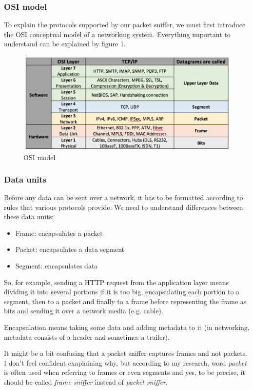 \documentclass[a4paper]{article}
\begin{document}
  \subsubsection{OSI model}
  
  To explain the protocols supported by our packet sniffer, we must first 
  introduce the OSI conceptual model of a networking system. Everything 
  important to understand can be explained by figure 1.


  \begin{figure}[h]
    \centering
    \includegraphics[width=\textwidth]{./src/osi.eps}
    \caption{OSI model}
  \end{figure}

  \subsubsection{Data units}

  Before any data can be sent over a network, it has to be formatted according
  to rules that various protocols provide. We need to understand differences
  between these data units:
  \begin{itemize}
    \item Frame: encapsulates a packet
    \item Packet: encapsulates a data segment
    \item Segment: encapsulates data
  \end{itemize}
  So, for example, sending a HTTP request from the application layer means
  dividing it into several portions if it is too big, encapsulating each portion
  to a segment, then to a packet and finally to a frame before representing the 
  frame as bits and sending it over a network media (e.g. cable).

  \begin{notes}
    \item Encapsulation means taking some data and adding metadata to it (in
      networking, metadata consists of a header and sometimes a trailer).
    \item It might be a bit confusing that a packet sniffer captures frames and
      not packets. I don't feel confident exaplaining why, but according to my
      research, word \textit{packet} is often used when referring to frames or 
      even segments and yes, to be precise, it should be called 
      \textit{frame sniffer} instead of \textit{packet sniffer}.
  \end{notes}
\end{document}
